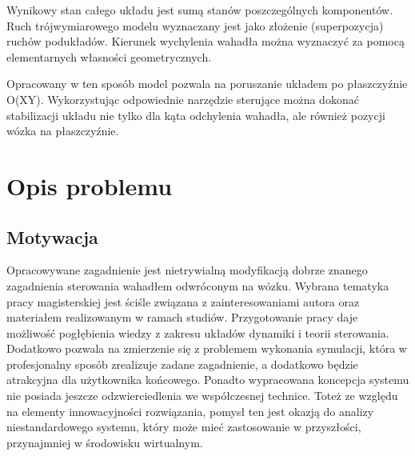 \documentclass[12pt, oneside]{report}
\theoremstyle{definition}
\begin{document}
Wynikowy stan całego układu jest sumą stanów poszczególnych komponentów. Ruch trójwymiarowego modelu wyznaczany jest jako złożenie (superpozycja) ruchów podukładów. Kierunek wychylenia wahadła można wyznaczyć za pomocą elementarnych własności geometrycznych. 

Opracowany w ten sposób model pozwala na poruszanie układem po płaszczyźnie O(XY). Wykorzystując odpowiednie narzędzie sterujące można dokonać stabilizacji układu nie tylko dla kąta odchylenia wahadła, ale również pozycji wózka na płaszczyźnie.

\section{Opis problemu}
\subsection{Motywacja}
Opracowywane zagadnienie jest nietrywialną modyfikacją dobrze znanego zagadnienia sterowania wahadłem odwróconym na wózku. Wybrana tematyka pracy magisterskiej jest ściśle związana z zainteresowaniami autora oraz materiałem realizowanym w ramach studiów. Przygotowanie pracy daje możliwość pogłębienia wiedzy z zakresu układów dynamiki i teorii sterowania. Dodatkowo pozwala na zmierzenie się z problemem wykonania symulacji, która w profesjonalny sposób zrealizuje zadane zagadnienie, a dodatkowo będzie atrakcyjna dla użytkownika końcowego. Ponadto wypracowana koncepcja systemu nie posiada jeszcze odzwierciedlenia we współczesnej technice. Toteż ze względu na elementy innowacyjności rozwiązania, pomysł ten jest okazją do analizy niestandardowego systemu, który może mieć zastosowanie w przyszłości, przynajmniej w środowisku wirtualnym.
\end{document}
